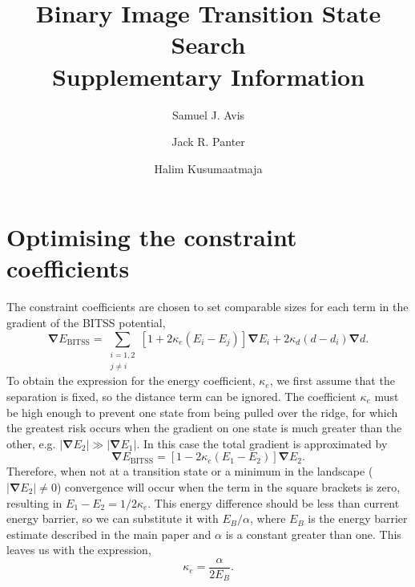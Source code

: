 \documentclass[10pt]{revtex4}
\newcommand{\abs}[1]{\left| #1 \right|}
\newcommand{\grad}{\bm{\nabla}}
\begin{document}
\title{Binary Image Transition State Search \\ Supplementary Information}
\author{Samuel J. Avis}
\author{Jack R. Panter}
\author{Halim Kusumaatmaja}
\maketitle

\section{Optimising the constraint coefficients}
The constraint coefficients are chosen to set comparable sizes for each term in the gradient of the BITSS potential,
\begin{equation} \label{eq:gradBITSS}
  \grad E_\text{BITSS} = \sum_{\substack{i=1,2 \\ j\neq i}} \left[ 1 + 2 \kappa_e (E_i - E_j) \right] \grad E_i + 2 \kappa_d (d - d_i) \grad d.
\end{equation}
To obtain the expression for the energy coefficient, $\kappa_e$, we first assume that the separation is fixed, so the distance term can be ignored.
The coefficient $\kappa_e$ must be high enough to prevent one state from being pulled over the ridge, for which the greatest risk occurs when the gradient on one state is much greater than the other, e.g. $\abs{\grad E_2} \gg \abs{\grad E_1}$.
In this case the total gradient is approximated by
\begin{equation}
  \grad E_\text{BITSS} = \left[ 1 - 2 \kappa_e (E_1 - E_2) \right] \grad E_2.
\end{equation}
Therefore, when not at a transition state or a minimum in the landscape ($\abs{\grad E_2} \neq 0$) convergence will occur when the term in the square brackets is zero, resulting in $E_1 - E_2 = 1 / 2 \kappa_e$.
This energy difference should be less than current energy barrier, so we can substitute it with $E_B / \alpha$, where $E_B$ is the energy barrier estimate described in the main paper and $\alpha$ is a constant greater than one.
This leaves us with the expression,
\begin{equation}
  \kappa_e = \frac {\alpha} {2 E_B}.
\end{equation}
\end{document}
